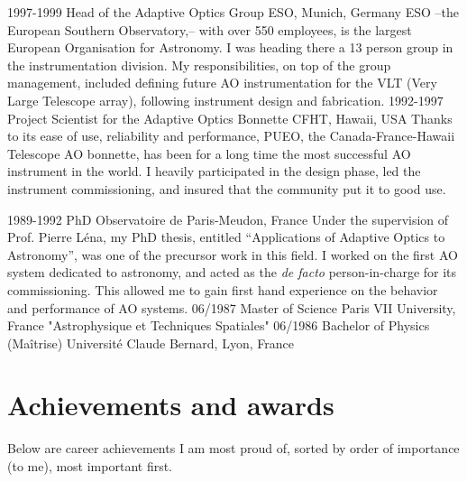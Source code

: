 \documentclass[]{friggeri-cv}
\begin{document}
\begin{entrylist}
  \entry
    {1997-1999}
    {Head of the Adaptive Optics Group}
    {ESO, Munich, Germany}
    {ESO --the European Southern Observatory,-- with over 550 employees, is the largest European Organisation for Astronomy. I was heading there a 13 person group in the instrumentation division. My responsibilities, on top of the group management, included defining future AO instrumentation for the VLT (Very Large Telescope array), following instrument design and fabrication.}
  \entry
    {1992-1997}
    {Project Scientist for the Adaptive Optics Bonnette}
    {CFHT, Hawaii, USA}
    {Thanks to its ease of use, reliability and performance, PUEO, the Canada-France-Hawaii Telescope AO bonnette, has been for a long time the most successful AO instrument in the world. I heavily participated in the design phase, led the instrument commissioning, and insured that the community put it to good use.}
  \end{entrylist}
  \begin{entrylist}
  \entry
    {1989-1992}
    {PhD}
    {Observatoire de Paris-Meudon, France}
    {Under the supervision of Prof. Pierre Léna, my PhD thesis, entitled ``Applications of Adaptive Optics to Astronomy'', was one of the precursor work in this field. I worked on the first AO system dedicated to astronomy, and acted as the {\em de facto} person-in-charge for its commissioning. This allowed me to gain first hand experience on the behavior and performance of AO systems.}
  \entry
    {06/1987}
    {Master of Science}
    {Paris VII University, France}
    {"Astrophysique et Techniques Spatiales"}
  \entry
    {06/1986}
    {Bachelor of Physics (Ma\^itrise)}
    {Universit\'e Claude Bernard, Lyon, France}
    {}
\end{entrylist}

\section{Achievements and awards}


Below are career achievements I am most proud of, sorted by order of importance (to me), most important first.
\end{document}

